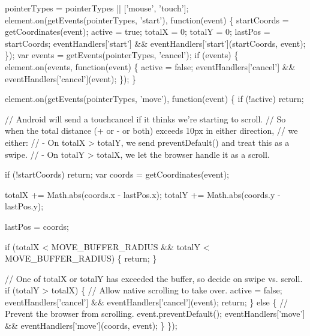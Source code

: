 \begin{DoxyCodeInclude}
      pointerTypes = pointerTypes || [\textcolor{stringliteral}{'mouse'}, \textcolor{stringliteral}{'touch'}];
      element.on(getEvents(pointerTypes, \textcolor{stringliteral}{'start'}), \textcolor{keyword}{function}(event) \{
        startCoords = getCoordinates(event);
        active = \textcolor{keyword}{true};
        totalX = 0;
        totalY = 0;
        lastPos = startCoords;
        eventHandlers[\textcolor{stringliteral}{'start'}] && eventHandlers[\textcolor{stringliteral}{'start'}](startCoords, event);
      \});
      var events = getEvents(pointerTypes, \textcolor{stringliteral}{'cancel'});
      \textcolor{keywordflow}{if} (events) \{
        element.on(events, \textcolor{keyword}{function}(event) \{
          active = \textcolor{keyword}{false};
          eventHandlers[\textcolor{stringliteral}{'cancel'}] && eventHandlers[\textcolor{stringliteral}{'cancel'}](event);
        \});
      \}

      element.on(getEvents(pointerTypes, \textcolor{stringliteral}{'move'}), \textcolor{keyword}{function}(event) \{
        \textcolor{keywordflow}{if} (!active) \textcolor{keywordflow}{return};

        \textcolor{comment}{// Android will send a touchcancel if it thinks we're starting to scroll.}
        \textcolor{comment}{// So when the total distance (+ or - or both) exceeds 10px in either direction,}
        \textcolor{comment}{// we either:}
        \textcolor{comment}{// - On totalX > totalY, we send preventDefault() and treat this as a swipe.}
        \textcolor{comment}{// - On totalY > totalX, we let the browser handle it as a scroll.}

        \textcolor{keywordflow}{if} (!startCoords) \textcolor{keywordflow}{return};
        var coords = getCoordinates(event);

        totalX += Math.abs(coords.x - lastPos.x);
        totalY += Math.abs(coords.y - lastPos.y);

        lastPos = coords;

        \textcolor{keywordflow}{if} (totalX < MOVE\_BUFFER\_RADIUS && totalY < MOVE\_BUFFER\_RADIUS) \{
          \textcolor{keywordflow}{return};
        \}

        \textcolor{comment}{// One of totalX or totalY has exceeded the buffer, so decide on swipe vs. scroll.}
        \textcolor{keywordflow}{if} (totalY > totalX) \{
          \textcolor{comment}{// Allow native scrolling to take over.}
          active = \textcolor{keyword}{false};
          eventHandlers[\textcolor{stringliteral}{'cancel'}] && eventHandlers[\textcolor{stringliteral}{'cancel'}](event);
          \textcolor{keywordflow}{return};
        \} \textcolor{keywordflow}{else} \{
          \textcolor{comment}{// Prevent the browser from scrolling.}
          \textcolor{keyword}{event}.preventDefault();
          eventHandlers[\textcolor{stringliteral}{'move'}] && eventHandlers[\textcolor{stringliteral}{'move'}](coords, event);
        \}
      \});


\end{DoxyCodeInclude}
